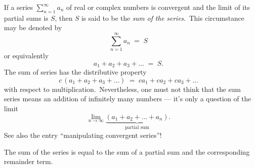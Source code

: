 \documentclass[12pt]{article}
\begin{document}
If a series $\sum_{n = 1}^\infty a_n$ of real or complex 
numbers is convergent and the limit of its partial sums is $S$,
then $S$ is said to be the {\em sum of the series}.\, This 
circumstance may be denoted by
     $$\sum_{n = 1}^\infty a_n \;=\; S$$
or equivalently
     $$a_1+a_2+a_3+\ldots \;=\; S.$$
The sum of series has the distributive property
$$c\,(a_1+a_2+a_3+\ldots) \;=\; ca_1+ca_2+ca_3+\ldots$$
with respect to multiplication.\, Nevertheless, one must not 
think that the sum series means an addition of infinitely many 
numbers --- it's only a question of the limit
$$\lim_{n\to\infty}
\underbrace{(a_1+a_2+\ldots+a_n)}_{\textrm{partial sum}}.$$
See also the entry ``manipulating convergent series''!

The sum of the series is equal to the sum of a partial sum and 
the corresponding remainder term.
\end{document}
